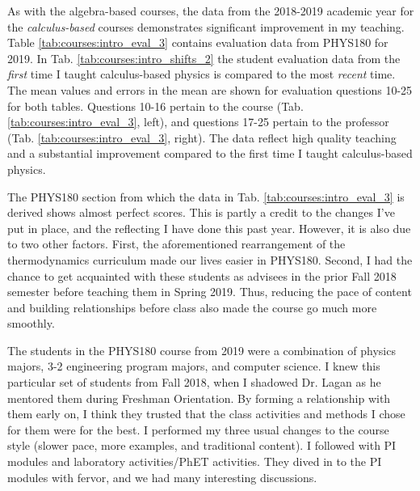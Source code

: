 \documentclass[../../main.tex]{subfiles}
\begin{document}
As with the algebra-based courses, the data from the 2018-2019 academic year for the \textit{calculus-based} courses demonstrates significant improvement in my teaching.  Table \ref{tab:courses:intro_eval_3} contains evaluation data from PHYS180 for 2019.  In Tab. \ref{tab:courses:intro_shifts_2} the student evaluation data from the \textit{first} time I taught calculus-based physics is compared to the most \textit{recent} time.  The mean values and errors in the mean are shown for evaluation questions 10-25 for both tables.  Questions 10-16 pertain to the course (Tab. \ref{tab:courses:intro_eval_3}, left), and questions 17-25 pertain to the professor (Tab. \ref{tab:courses:intro_eval_3}, right).  The data reflect high quality teaching and a substantial improvement compared to the first time I taught calculus-based physics. \\ \hspace{0.1cm}

The PHYS180 section from which the data in Tab. \ref{tab:courses:intro_eval_3} is derived shows almost perfect scores.  This is partly a credit to the changes I've put in place, and the reflecting I have done this past year.  However, it is also due to two other factors.  First, the aforementioned rearrangement of the thermodynamics curriculum made our lives easier in PHYS180.  Second, I had the chance to get acquainted with these students as advisees in the prior Fall 2018 semester before teaching them in Spring 2019.  Thus, reducing the pace of content and building relationships before class also made the course go much more smoothly. \\ \hspace{0.1cm}

The students in the PHYS180 course from 2019 were a combination of physics majors, 3-2 engineering program majors, and computer science.  I knew this particular set of students from Fall 2018, when I shadowed Dr. Lagan as he mentored them during Freshman Orientation.  By forming a relationship with them early on, I think they trusted that the class activities and methods I chose for them were for the best.  I performed my three usual changes to the course style (slower pace, more examples, and traditional content).  I followed with PI modules and laboratory activities/PhET activities.  They dived in to the PI modules with fervor, and we had many interesting discussions. \\ \hspace{0.1cm}
\end{document}
